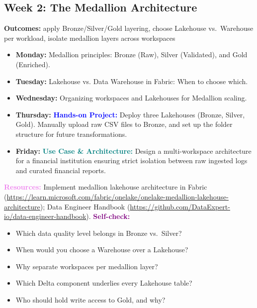 \documentclass[11pt, a4paper]{article}
\newcommand{\project}[1]{\vspace{1mm}\noindent\textbf{\textcolor{blue}{Hands-on Project:}} #1}
\newcommand{\usecase}[1]{\vspace{1mm}\noindent\textbf{\textcolor{teal}{Use Case \& Architecture:}} #1}
\newcommand{\dayitem}[2]{\item \textbf{#1:} #2}
\newcommand{\resources}[1]{\vspace{1mm}\noindent\textbf{\textcolor{violet}{Resources:}} #1}
\newcommand{\selfcheck}[1]{\vspace{1mm}\noindent\textbf{\textcolor{purple}{Self-check:}} #1}
\begin{document}
\subsection*{Week 2: The Medallion Architecture}
\par\noindent\textbf{Outcomes:} apply Bronze/Silver/Gold layering, choose Lakehouse vs.\ Warehouse per workload, isolate medallion layers across workspaces
\begin{itemize}[label=-]
    \dayitem{Monday}{Medallion principles: Bronze (Raw), Silver (Validated), and Gold (Enriched).}
    \dayitem{Tuesday}{Lakehouse vs. Data Warehouse in Fabric: When to choose which.}
    \dayitem{Wednesday}{Organizing workspaces and Lakehouses for Medallion scaling.}
    \dayitem{Thursday}{\project{Deploy three Lakehouses (Bronze, Silver, Gold). Manually upload raw CSV files to Bronze, and set up the folder structure for future transformations.}}
    \dayitem{Friday}{\usecase{Design a multi-workspace architecture for a financial institution ensuring strict isolation between raw ingested logs and curated financial reports.}}
\end{itemize}
\resources{Implement medallion lakehouse architecture in Fabric (\url{https://learn.microsoft.com/fabric/onelake/onelake-medallion-lakehouse-architecture}); Data Engineer Handbook (\url{https://github.com/DataExpert-io/data-engineer-handbook}).}
\selfcheck{
\begin{itemize}[label=$\bullet$, leftmargin=6mm, itemsep=0pt]
    \item Which data quality level belongs in Bronze vs.\ Silver?
    \item When would you choose a Warehouse over a Lakehouse?
    \item Why separate workspaces per medallion layer?
    \item Which Delta component underlies every Lakehouse table?
    \item Who should hold write access to Gold, and why?
\end{itemize}
}
\end{document}
